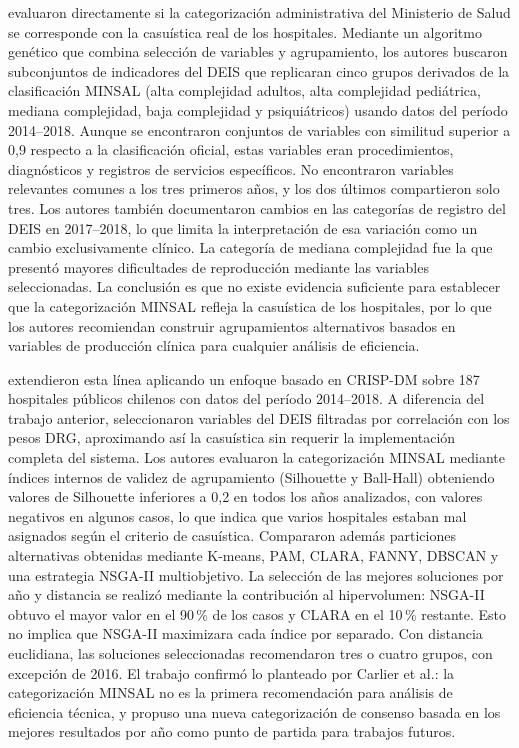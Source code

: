 \citet{Carlier2020} evaluaron directamente si la categorización
administrativa del Ministerio de Salud se corresponde con la casuística
real de los hospitales. Mediante un algoritmo genético que combina selección de
variables y agrupamiento, los autores buscaron subconjuntos de indicadores del DEIS
que replicaran cinco grupos derivados de la clasificación MINSAL
(alta complejidad adultos, alta complejidad
pediátrica, mediana complejidad, baja complejidad y psiquiátricos) usando datos
del período 2014--2018. Aunque se encontraron conjuntos de variables con similitud
superior a 0{,}9 respecto a la clasificación oficial, estas variables eran
procedimientos, diagnósticos y registros de servicios específicos. No encontraron
variables relevantes comunes a los tres primeros años, y los dos últimos
compartieron solo tres. Los autores también documentaron cambios en las
categorías de registro del DEIS en 2017--2018, lo que limita la interpretación
de esa variación como un cambio exclusivamente clínico. La categoría de mediana
complejidad fue la que presentó mayores dificultades de reproducción mediante
las variables seleccionadas. La conclusión es que no existe evidencia suficiente para
establecer que la categorización MINSAL refleja la casuística de los
hospitales, por lo que los autores recomiendan construir agrupamientos alternativos
basados en variables de producción clínica para cualquier análisis de eficiencia.

\citet{Giglio2021} extendieron esta línea aplicando un enfoque
basado en CRISP-DM sobre 187 hospitales públicos chilenos con datos del período
2014--2018. A diferencia del trabajo anterior, seleccionaron variables del DEIS
filtradas por correlación con los pesos DRG, aproximando así la casuística
sin requerir la implementación completa del sistema. Los autores evaluaron la
categorización MINSAL mediante índices internos de validez de agrupamiento
(Silhouette y Ball-Hall) obteniendo valores de Silhouette inferiores a 0{,}2 en
todos los años analizados, con valores negativos en algunos casos, lo que indica
que varios hospitales estaban mal asignados según el criterio de casuística.
Compararon además particiones alternativas obtenidas mediante K-means, PAM,
CLARA, FANNY, DBSCAN y una estrategia NSGA-II multiobjetivo. La selección de
las mejores soluciones por año y distancia se realizó mediante la contribución
al hipervolumen: NSGA-II obtuvo el mayor valor en el 90\,\% de los casos y
CLARA en el 10\,\% restante. Esto no implica que NSGA-II maximizara cada
índice por separado. Con distancia euclidiana, las soluciones seleccionadas
recomendaron tres o cuatro grupos, con excepción de 2016. El trabajo confirmó lo planteado por Carlier et al.:
la categorización MINSAL no es la primera recomendación para análisis de
eficiencia técnica, y propuso una nueva categorización de consenso basada en los
mejores resultados por año como punto de partida para trabajos futuros.

